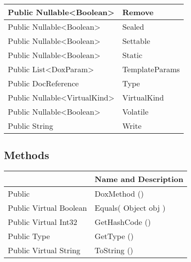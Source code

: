 \documentclass[11pt, oneside, a4paper]{book}
\begin{document}
\begin{center}
\begin{tabular}{| p{3cm} | p{12cm} | }
\hline
 Public  Nullable<Boolean> &  Remove\hypertarget{SoftwareEngineeringTools.{}Documentation.{}DoxMethod.{}Remove}{}\\
\hline
 Public  Nullable<Boolean> &  Sealed\hypertarget{SoftwareEngineeringTools.{}Documentation.{}DoxMethod.{}Sealed}{}\\
\hline
 Public  Nullable<Boolean> &  Settable\hypertarget{SoftwareEngineeringTools.{}Documentation.{}DoxMethod.{}Settable}{}\\
\hline
 Public  Nullable<Boolean> &  Static\hypertarget{SoftwareEngineeringTools.{}Documentation.{}DoxMethod.{}Static}{}\\
\hline
 Public  List<DoxParam> &  TemplateParams\hypertarget{SoftwareEngineeringTools.{}Documentation.{}DoxMethod.{}TemplateParams}{}\\
\hline
 Public  DocReference &  Type\hypertarget{SoftwareEngineeringTools.{}Documentation.{}DoxMethod.{}Type}{}\\
\hline
 Public  Nullable<VirtualKind> &  VirtualKind\hypertarget{SoftwareEngineeringTools.{}Documentation.{}DoxMethod.{}VirtualKind}{}\\
\hline
 Public  Nullable<Boolean> &  Volatile\hypertarget{SoftwareEngineeringTools.{}Documentation.{}DoxMethod.{}Volatile}{}\\
\hline
 Public  String &  Write\hypertarget{SoftwareEngineeringTools.{}Documentation.{}DoxMethod.{}Write}{}\\
\hline
\end{tabular}
\end{center}

\subsection{Methods}
\begin{center}
\begin{tabular}{| p{3cm} | p{12cm} | }
\hline
\textbf{ } & \textbf{ Name and Description}\\
\hline
 Public  &  DoxMethod ()\hypertarget{SoftwareEngineeringTools.{}Documentation.{}DoxMethod.{}DoxMethod}{}\\
\hline
 Public  Virtual  Boolean &  Equals(\hypertarget{SoftwareEngineeringTools.{}Documentation.{}DoxMethod.{}Equals\_Object}{} Object  obj  )\\
\hline
 Public  Virtual  Int32 &  GetHashCode ()\hypertarget{SoftwareEngineeringTools.{}Documentation.{}DoxMethod.{}GetHashCode}{}\\
\hline
 Public  Type &  GetType ()\hypertarget{SoftwareEngineeringTools.{}Documentation.{}DoxMethod.{}GetType}{}\\
\hline
 Public  Virtual  String &  ToString ()\hypertarget{SoftwareEngineeringTools.{}Documentation.{}DoxMethod.{}ToString}{}\\
\hline
\end{tabular}
\end{center}
 
\end{document}
